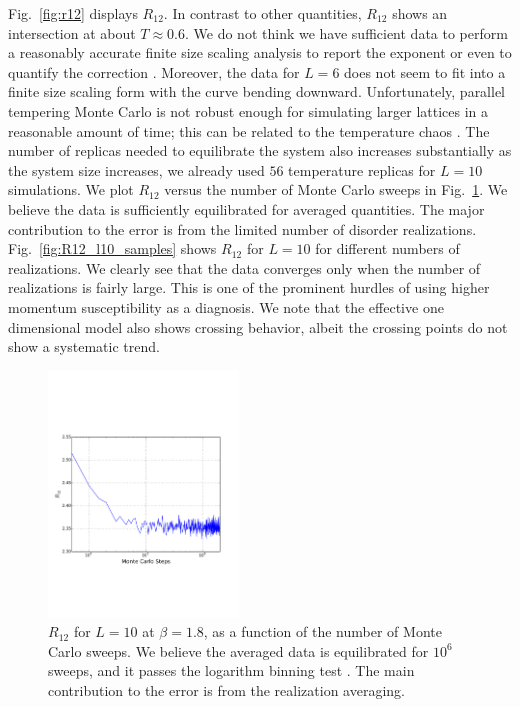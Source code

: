 \documentclass[aps,prb,twocolumn,showpacs,superscriptaddress]{revtex4}
\begin{document}
Fig.~\ref{fig:r12} displays $R_{12}$. In contrast to other quantities, $R_{12}$ shows an intersection 
at about $T \approx 0.6$. We do not think we have sufficient data to perform a reasonably accurate finite size 
scaling analysis to report the exponent or even to quantify the correction \cite{Hasenbusch-etal-2008}.
Moreover, the data for $L=6$ does not seem to fit into a finite size scaling form with the curve bending downward.
Unfortunately, parallel tempering Monte Carlo is not robust enough for simulating larger lattices in a reasonable 
amount of time; this can be related to the temperature chaos \cite{Ritort-1994,Fernandez-etal-2013,Katzgraber-etal-2007}. The number of replicas needed to equilibrate the system also 
increases substantially as the system size increases, we already used $56$ temperature 
replicas for $L=10$ simulations. We plot $R_{12}$ versus the number of Monte 
Carlo sweeps in Fig.~\ref{fig:MCsteps}. We believe the data is sufficiently equilibrated for averaged quantities.
The major contribution to the error is from the limited number of disorder realizations. Fig.~\ref{fig:R12_l10_samples} shows $R_{12}$ 
for $L=10$ for different numbers of realizations. We clearly see that the data converges only when the number of realizations is fairly large.
This is one of the prominent hurdles of using higher momentum susceptibility as a diagnosis. 
We note that the effective one dimensional model also shows crossing behavior,
albeit the crossing points do not show a systematic trend\cite{Larson-etal-2013}.


\begin{figure}[ht]
  \includegraphics[width=0.45\textwidth]{img/eq_l10.pdf}
  \caption{\label{fig:MCsteps} $R_{12}$ for $L=10$ at $\beta=1.8$, as a function of the 
number of Monte Carlo sweeps.  We believe the averaged data is equilibrated 
for $10^6$  sweeps, and it passes the logarithm binning 
test \cite{Alvarez-etal-2010}. The main contribution to the error is from the realization 
averaging.}
\end{figure}
\end{document}
